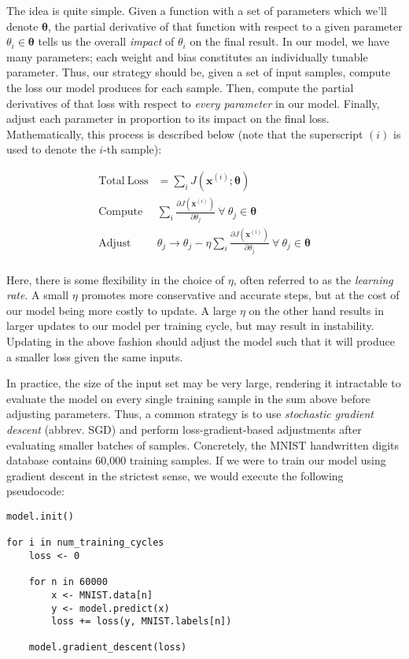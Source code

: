 \documentclass[
]{article}
\begin{document}
The idea is quite simple. Given a function with a set of parameters
which we'll denote \(\bm{\theta}\), the partial derivative of that
function with respect to a given parameter \(\theta_i \in \bm{\theta}\)
tells us the overall \emph{impact} of \(\theta_i\) on the final result.
In our model, we have many parameters; each weight and bias constitutes
an individually tunable parameter. Thus, our strategy should be, given a
set of input samples, compute the loss our model produces for each
sample. Then, compute the partial derivatives of that loss with respect
to \emph{every parameter} in our model. Finally, adjust each parameter
in proportion to its impact on the final loss. Mathematically, this
process is described below (note that the superscript \((i)\) is used to
denote the \(i\)-th sample):

\[
\begin{aligned}
\mathrm{Total~Loss} &= \sum_i J(\mathbf{x}^{(i)}; \bm\theta) \\
\mathrm{Compute}~ &\sum_i \frac{\partial J(\mathbf{x}^{(i)})}{\partial \theta_j} ~\forall ~\theta_j \in \bm\theta \\
\mathrm{Adjust}~ & \theta_j \rightarrow \theta_j - \eta \sum_i \frac{\partial J(\mathbf{x}^{(i)})}{\partial \theta_j} ~\forall ~\theta_j \in\bm\theta\\
\end{aligned}
\]

Here, there is some flexibility in the choice of \(\eta\), often
referred to as the \emph{learning rate}. A small \(\eta\) promotes more
conservative and accurate steps, but at the cost of our model being more
costly to update. A large \(\eta\) on the other hand results in larger
updates to our model per training cycle, but may result in instability.
Updating in the above fashion should adjust the model such that it will
produce a smaller loss given the same inputs.

In practice, the size of the input set may be very large, rendering it
intractable to evaluate the model on every single training sample in the
sum above before adjusting parameters. Thus, a common strategy is to use
\emph{stochastic gradient descent} (abbrev. SGD) and perform
loss-gradient-based adjustments after evaluating smaller batches of
samples. Concretely, the MNIST handwritten digits database contains
60,000 training samples. If we were to train our model using gradient
descent in the strictest sense, we would execute the following
pseudocode:

\begin{verbatim}
model.init()

for i in num_training_cycles
    loss <- 0

    for n in 60000
        x <- MNIST.data[n]
        y <- model.predict(x)
        loss += loss(y, MNIST.labels[n])
    
    model.gradient_descent(loss)
\end{verbatim}
\end{document}
